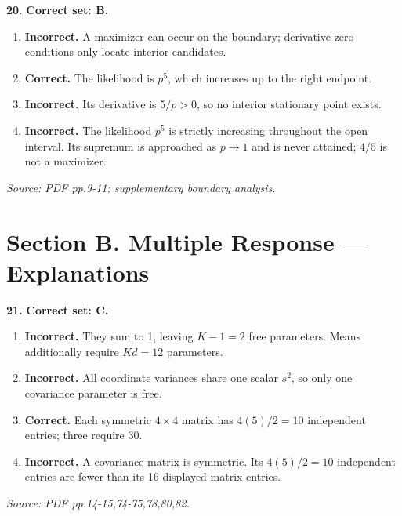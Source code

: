 \documentclass[11pt,a4paper]{article}
\begin{document}
\par\noindent\begin{minipage}{\linewidth}
\textbf{20.} \textbf{Correct set: B.}
\begin{enumerate}[label=(\Alph*),leftmargin=8mm,itemsep=2pt,topsep=2pt]
\item \textbf{Incorrect.} A maximizer can occur on the boundary; derivative-zero conditions only locate interior candidates.
\item \textbf{Correct.} The likelihood is \(p^5\), which increases up to the right endpoint.
\item \textbf{Incorrect.} Its derivative is \(5/p>0\), so no interior stationary point exists.
\item \textbf{Incorrect.} The likelihood \(p^5\) is strictly increasing throughout the open interval. Its supremum is approached as \(p\to1\) and is never attained; \(4/5\) is not a maximizer.
\end{enumerate}
{\footnotesize\textit{Source: PDF pp.9-11; supplementary boundary analysis.}}

\end{minipage}\par\vspace{3mm}
\newpage\section*{Section B. Multiple Response --- Explanations}
\par\noindent\begin{minipage}{\linewidth}
\textbf{21.} \textbf{Correct set: C.}
\begin{enumerate}[label=(\Alph*),leftmargin=8mm,itemsep=2pt,topsep=2pt]
\item \textbf{Incorrect.} They sum to 1, leaving \(K-1=2\) free parameters. Means additionally require \(Kd=12\) parameters.
\item \textbf{Incorrect.} All coordinate variances share one scalar \(s^2\), so only one covariance parameter is free.
\item \textbf{Correct.} Each symmetric \(4\times4\) matrix has \(4(5)/2=10\) independent entries; three require 30.
\item \textbf{Incorrect.} A covariance matrix is symmetric. Its \(4(5)/2=10\) independent entries are fewer than its 16 displayed matrix entries.
\end{enumerate}
{\footnotesize\textit{Source: PDF pp.14-15,74-75,78,80,82.}}

\end{minipage}\par\vspace{3mm}
\end{document}

